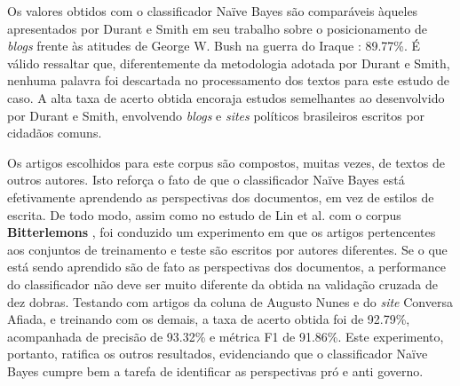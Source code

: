 



Os valores obtidos com o classificador Naïve Bayes são comparáveis àqueles apresentados por Durant e Smith em seu trabalho sobre o posicionamento de \emph{blogs} frente às atitudes de George W. Bush na guerra do Iraque \cite{durant-smith}: 89.77\%. É válido ressaltar que, diferentemente da metodologia adotada por Durant e Smith, nenhuma palavra foi descartada no processamento dos textos para este estudo de caso. A alta taxa de acerto obtida encoraja estudos semelhantes ao desenvolvido por Durant e Smith, envolvendo \emph{blogs} e \emph{sites} políticos brasileiros escritos por cidadãos comuns. %

Os artigos escolhidos para este corpus são compostos, muitas vezes, de textos de outros autores. Isto reforça o fato de que o classificador Naïve Bayes está efetivamente aprendendo as perspectivas dos documentos, em vez de estilos de escrita. De todo modo, assim como no estudo de Lin et al. com o corpus \textbf{Bitterlemons} \cite{lin-et-al2006}, foi conduzido um experimento em que os artigos pertencentes aos conjuntos de treinamento e teste são escritos por autores diferentes. Se o que está sendo aprendido são de fato as perspectivas dos documentos, a performance do classificador não deve ser muito diferente da obtida na validação cruzada de dez dobras. Testando com artigos da coluna de Augusto Nunes e do \emph{site} Conversa Afiada, e treinando com os demais, a taxa de acerto obtida foi de 92.79\%, acompanhada de precisão de 93.32\% e métrica F1 de 91.86\%. Este experimento, portanto, ratifica os outros resultados, evidenciando que o classificador Naïve Bayes cumpre bem a tarefa de identificar as perspectivas pró e anti governo.


